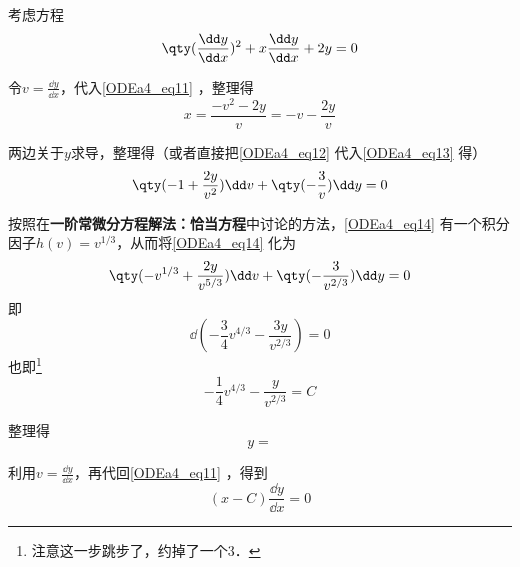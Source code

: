 \begin{example}{}
考虑方程
\begin{equation}\label{ODEa4_eq11}
\qty(\frac{\dd y}{\dd x})^2+x\frac{\dd y}{\dd x}+2y=0
\end{equation}

令$v=\frac{\dd y}{\dd x}$，代入\autoref{ODEa4_eq11} ，整理得
\begin{equation}\label{ODEa4_eq12}
x=\frac{-v^2-2y}{v}=-v-\frac{2y}{v}
\end{equation}



两边关于$y$求导，整理得（或者直接把\autoref{ODEa4_eq12} 代入\autoref{ODEa4_eq13} 得）
\begin{equation}\label{ODEa4_eq14}
\qty(-1+\frac{2y}{v^2})\dd v+\qty(-\frac{3}{v})\dd y=0
\end{equation}

按照在\textbf{一阶常微分方程解法：恰当方程}中讨论的方法，\autoref{ODEa4_eq14} 有一个积分因子$h(v)=v^{1/3}$，从而将\autoref{ODEa4_eq14} 化为
\begin{equation}
\qty(-v^{1/3}+\frac{2y}{v^{5/3}})\dd v+\qty(-\frac{3}{v^{2/3}})\dd y=0
\end{equation}
即
\begin{equation}
\dd (-\frac{3}{4}v^{4/3}-\frac{3y}{v^{2/3}})=0
\end{equation}
也即\footnote{注意这一步跳步了，约掉了一个$3$．}
\begin{equation}
-\frac{1}{4}v^{4/3}-\frac{y}{v^{2/3}}=C
\end{equation}

整理得
\begin{equation}
y=
\end{equation}

利用$v=\frac{\dd y}{\dd x}$，再代回\autoref{ODEa4_eq11} ，得到
\begin{equation}
(x-C)\frac{\dd y}{\dd x}=0
\end{equation}



\end{example}




















